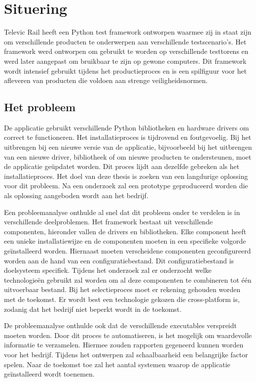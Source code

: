 \chapter{Situering}\label{hfdst:situering}
Televic Rail heeft een Python test framework ontworpen waarmee zij in staat zijn om verschillende producten te onderwerpen aan verschillende testscenario's.
Het framework werd ontworpen om gebruikt te worden op verschillende testtorens en werd later aangepast om bruikbaar te zijn op gewone computers.
Dit framework wordt intensief gebruikt tijdens het productieproces en is een spilfiguur voor het afleveren van producten die voldoen aan strenge veiligheidsnormen.

\section{Het probleem}\label{sec:probleem}
De applicatie gebruikt verschillende Python bibliotheken en hardware drivers om correct te functioneren.
Het installatieproces is tijdrovend en foutgevoelig.
Bij het uitbrengen bij een nieuwe versie van de applicatie, bijvoorbeeld bij het uitbrengen van een nieuwe driver, bibliotheek of om nieuwe producten te ondersteunen, moet de applicatie geüpdatet worden.
Dit proces lijdt aan dezelfde gebreken als het installatieproces.
Het doel van deze thesis is zoeken van een langdurige oplossing voor dit probleem.
Na een onderzoek zal een prototype geproduceerd worden die als oplossing aangeboden wordt aan het bedrijf.

Een probleemanalyse onthulde al snel dat dit probleem onder te verdelen is in verschillende deelproblemen.
Het framework bestaat uit verschillende componenten, hieronder vallen de drivers en bibliotheken.
Elke component heeft een unieke installatiewijze en de componenten moeten in een specifieke volgorde geïnstalleerd worden.
Hiernaast moeten verscheidene componenten geconfigureerd worden aan de hand van een configuratiebestand.
Dit configuratiebestand is doelsysteem specifiek.
Tijdens het onderzoek zal er onderzocht welke technologieën gebruikt zal worden om al deze componenten te combineren tot één uitvoerbaar bestand.
Bij het selectieproces moet er rekening gehouden worden met de toekomst.
Er wordt best een technologie gekozen die cross-platform is, zodanig dat het bedrijf niet beperkt wordt in de toekomst.

De probleemanalyse onthulde ook dat de verschillende executables verspreidt moeten worden.
Door dit proces te automatiseren, is het mogelijk om waardevolle informatie te verzamelen.
Hiermee zouden rapporten gegeneerd kunnen worden voor het bedrijf.
Tijdens het ontwerpen zal schaalbaarheid een belangrijke factor spelen.
Naar de toekomst toe zal het aantal systemen waarop de applicatie geïnstalleerd wordt toenemen.

